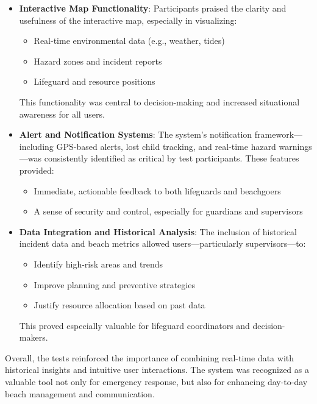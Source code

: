 \begin{itemize}
    \item \textbf{Interactive Map Functionality}: Participants praised the clarity and usefulness of the interactive map, especially in visualizing:
    \begin{itemize}
        \item Real-time environmental data (e.g., weather, tides)
        \item Hazard zones and incident reports
        \item Lifeguard and resource positions
    \end{itemize}
    This functionality was central to decision-making and increased situational awareness for all users.

    \item \textbf{Alert and Notification Systems}: The system's notification framework—including GPS-based alerts, lost child tracking, and real-time hazard warnings—was consistently identified as critical by test participants. These features provided:
    \begin{itemize}
        \item Immediate, actionable feedback to both lifeguards and beachgoers
        \item A sense of security and control, especially for guardians and supervisors
    \end{itemize}

    \item \textbf{Data Integration and Historical Analysis}: The inclusion of historical incident data and beach metrics allowed users—particularly supervisors—to:
    \begin{itemize}
        \item Identify high-risk areas and trends
        \item Improve planning and preventive strategies
        \item Justify resource allocation based on past data
    \end{itemize}
    This proved especially valuable for lifeguard coordinators and decision-makers.
\end{itemize}

Overall, the tests reinforced the importance of combining real-time data with historical insights and intuitive user interactions. The system was recognized as a valuable tool not only for emergency response, but also for enhancing day-to-day beach management and communication.

